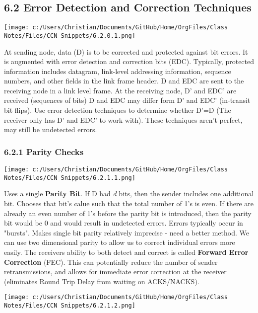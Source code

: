 \documentclass[11pt]{article}
\begin{document}
\subsection{6.2 Error Detection and Correction Techniques}
\label{sec:org14c04ce}
\begin{figure*}
\centering
\texttt{[image: c:/Users/Christian/Documents/GitHub/Home/OrgFiles/Class Notes/Files/CCN Snippets/6.2.0.1.png]}
\end{figure*}

At sending node, data (D) is to be corrected and protected against bit errors. It is augmented with error detection and correction bits (EDC).
Typically, protected information includes datagram, link-level addressing information, sequence numbers, and other fields in the link frame header.
D and EDC are sent to the receiving node in a link level frame. At the receiving node, D' and EDC' are received (sequences of bits) D and EDC may differ form D' and EDC' (in-transit bit flips). Use error detection techniques to determine whether D'=D (The receiver only has D' and EDC' to work with). These techniques aren't perfect, may still be undetected errors. 

\subsubsection{6.2.1 Parity Checks}
\label{sec:orgb218015}
\begin{figure*}
\centering
\texttt{[image: c:/Users/Christian/Documents/GitHub/Home/OrgFiles/Class Notes/Files/CCN Snippets/6.2.1.1.png]}
\end{figure*}
Uses a single \textbf{Parity Bit}.
If D had \emph{d} bits, then the sender includes one additional bit. Chooses that bit's calue such that the total number of 1's is even.
If there are already an even number of 1's before the parity bit is introduced, then the parity bit would be 0 and would result in undetected errors.
Errors typically occur in "bursts". Makes single bit parity relatively imprecise - need a better method.
We can use two dimensional parity to allow us to correct individual errors more easily.
The receivers ability to both detect and correct is called \textbf{Forward Error Correction} (FEC). This can potentially reduce the number of sender retransmissions, and allows for immediate error correction at the receiver (eliminates Round Trip Delay from waiting on ACKS/NACKS).
\begin{figure*}
\centering
\texttt{[image: c:/Users/Christian/Documents/GitHub/Home/OrgFiles/Class Notes/Files/CCN Snippets/6.2.1.2.png]}
\end{figure*}
\end{document}
